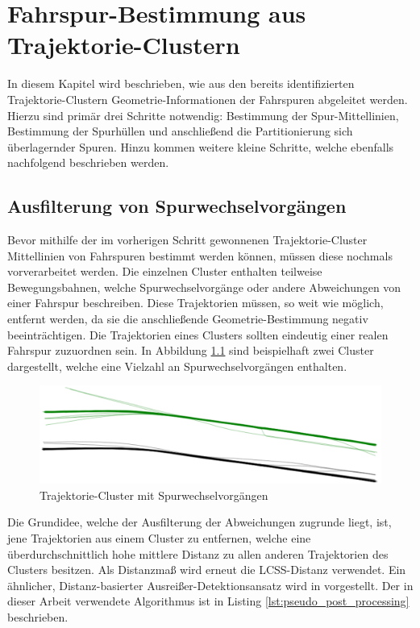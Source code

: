 
\chapter{Fahrspur-Bestimmung aus Trajektorie-Clustern}
\label{cha:lane_definition}

In diesem Kapitel wird beschrieben, wie aus den bereits identifizierten Trajektorie-Clustern
Geometrie-Informationen der Fahrspuren abgeleitet werden. Hierzu sind primär drei Schritte notwendig:
Bestimmung der Spur-Mittellinien, Bestimmung der Spurhüllen und anschließend die Partitionierung sich überlagernder
Spuren. Hinzu kommen weitere kleine Schritte, welche ebenfalls nachfolgend beschrieben werden.

\section{Ausfilterung von Spurwechselvorgängen}
\label{sec:real2_filter_lane_change}

Bevor mithilfe der im vorherigen Schritt gewonnenen Trajektorie-Cluster Mittellinien von Fahrspuren bestimmt
werden können, müssen diese nochmals vorverarbeitet werden. Die einzelnen Cluster enthalten teilweise
Bewegungsbahnen, welche Spurwechselvorgänge oder andere Abweichungen von einer Fahrspur beschreiben.
Diese Trajektorien müssen, so weit wie möglich,
entfernt werden, da sie die anschließende Geometrie-Bestimmung negativ beeinträchtigen. Die Trajektorien
eines Clusters sollten eindeutig einer realen Fahrspur zuzuordnen sein. In Abbildung
\ref{fig:real2_clusters_pre_postpro} sind beispielhaft zwei Cluster dargestellt, welche eine Vielzahl an
Spurwechselvorgängen enthalten.

\begin{figure}[H]
    \centering
    \includegraphics[width=0.8\linewidth]{resources/img/umsetzung/U2/Clusters_Pre_Postprocessing}
    \caption{Trajektorie-Cluster mit Spurwechselvorgängen}
    \label{fig:real2_clusters_pre_postpro}
\end{figure}

Die Grundidee, welche der Ausfilterung der Abweichungen zugrunde liegt, ist, jene Trajektorien
aus einem Cluster zu entfernen, welche eine überdurchschnittlich hohe mittlere Distanz zu allen anderen
Trajektorien des Clusters besitzen. Als Distanzmaß wird erneut die LCSS-Distanz verwendet.
Ein ähnlicher, Distanz-basierter Ausreißer-Detektionsansatz wird in \cite[]{Mirge2017} vorgestellt.
Der in dieser Arbeit verwendete Algorithmus ist in Listing \ref{lst:pseudo_post_processing} beschrieben.

